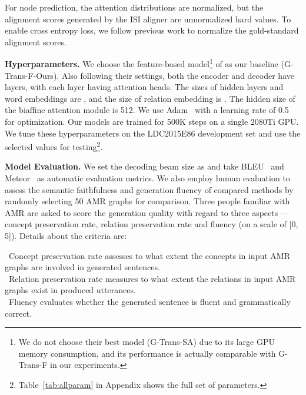 \documentclass[11pt,a4paper]{article}
\begin{document}
For node prediction, the attention distributions are normalized, but the alignment scores generated by the ISI aligner are unnormalized hard  values.
To enable cross entropy loss, we follow previous work \cite{mi-etal-2016-supervised} to normalize the gold-standard alignment scores.

\noindent \textbf{Hyperparameters.} 
We choose the feature-based model\footnote{We do not choose their best model (G-Trans-SA) due to its large GPU memory consumption, and its performance is actually comparable with G-Trans-F in our experiments.} of  \citet{zhu2019modeling} as our baseline (G-Trans-F-Ours).
Also following their settings, both the encoder and decoder have  layers, with each layer having  attention heads.
The sizes of hidden layers and word embeddings are , and the size of relation embedding is .
The hidden size of the biaffine attention module is 512.
We use Adam~\cite{Kingma2015AdamAM} with a learning rate of 0.5 for optimization. 
Our models are trained for 500K steps on a single 2080Ti GPU.
We tune these hyperparameters on the LDC2015E86 development set and use the selected values for testing\footnote{Table~\ref{tab:allparam} in Appendix shows the full set of parameters.}.

\noindent \textbf{Model Evaluation.} We set the decoding beam size as  and take BLEU~\cite{papineni-2002-bleu} and Meteor~\cite{banerjee-lavie-2005-meteor,denkowski-lavie-2014-meteor} as automatic evaluation metrics. 
We also employ human evaluation to assess the semantic faithfulness and generation fluency of compared methods by randomly selecting 50 AMR graphs for comparison. 
Three people familiar with AMR are asked to score the generation quality with regard to three aspects --- concept preservation rate, relation preservation rate and fluency (on a scale of [0, 5]). Details about the criteria are: 

\begin{adjustwidth}{0.5cm}{0cm}
	\indent\textbullet~Concept preservation rate assesses to what extent the concepts in input AMR graphs are involved in generated sentences. \\
	\noindent\textbullet~Relation preservation rate measures to what extent the relations in input AMR graphs exist in produced utterances. \\
	\noindent\textbullet~Fluency evaluates whether the generated sentence is fluent and grammatically correct. \\
\end{adjustwidth}
\end{document}
